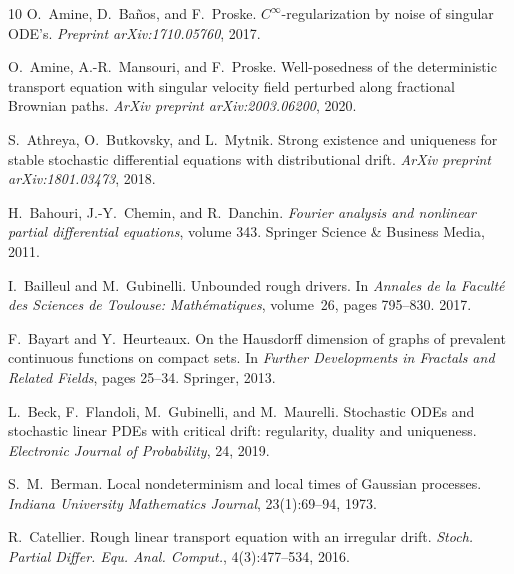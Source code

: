 \documentclass[10pt]{article}
\newcommand{\tmtextit}[1]{{\itshape{#1}}}
\begin{document}
\begin{thebibliography}{10}
  O.~Amine, D.~Ba{\~n}os, and  F.~Proske.
  {\newblock}$C^{\infty}$-regularization by noise of singular ODE's.
  {\newblock}\tmtextit{Preprint arXiv:1710.05760}, 2017.{\newblock}
  
  O.~Amine, A.-R.~Mansouri, and  F.~Proske.
  {\newblock}Well-posedness of the deterministic transport equation with
  singular velocity field perturbed along fractional Brownian paths.
  {\newblock}\tmtextit{ArXiv preprint arXiv:2003.06200}, 2020.{\newblock}
  
  S.~Athreya, O.~Butkovsky, and  L.~Mytnik.
  {\newblock}Strong existence and uniqueness for stable stochastic
  differential equations with distributional drift. {\newblock}\tmtextit{ArXiv
  preprint arXiv:1801.03473}, 2018.{\newblock}
  
  H.~Bahouri, J.-Y.~Chemin, and  R.~Danchin.
  {\newblock}\tmtextit{Fourier analysis and nonlinear partial differential
  equations},  volume  343. {\newblock}Springer Science \& Business Media,
  2011.{\newblock}
  
  I.~Bailleul  and  M.~Gubinelli. {\newblock}Unbounded
  rough drivers. {\newblock}In \tmtextit{Annales de la Facult{\'e} des
  Sciences de Toulouse: Math{\'e}matiques},  volume~26,  pages  795--830.
  2017.{\newblock}
  
  F.~Bayart  and  Y.~Heurteaux. {\newblock}On the Hausdorff
  dimension of graphs of prevalent continuous functions on compact sets.
  {\newblock}In \tmtextit{Further Developments in Fractals and Related
  Fields},  pages  25--34. Springer, 2013.{\newblock}
  
  L.~Beck, F.~Flandoli, M.~Gubinelli, and  M.~Maurelli.
  {\newblock}Stochastic ODEs and stochastic linear PDEs with critical drift:
  regularity, duality and uniqueness. {\newblock}\tmtextit{Electronic Journal
  of Probability}, 24, 2019.{\newblock}
  
  S.~M.~Berman. {\newblock}Local nondeterminism and local
  times of Gaussian processes. {\newblock}\tmtextit{Indiana University
  Mathematics Journal}, 23(1):69--94, 1973.{\newblock}
  
  R.~Catellier. {\newblock}Rough linear transport
  equation with an irregular drift. {\newblock}\tmtextit{Stoch. Partial
  Differ. Equ. Anal. Comput.}, 4(3):477--534, 2016.{\newblock}
  

\end{thebibliography}
\end{document}
